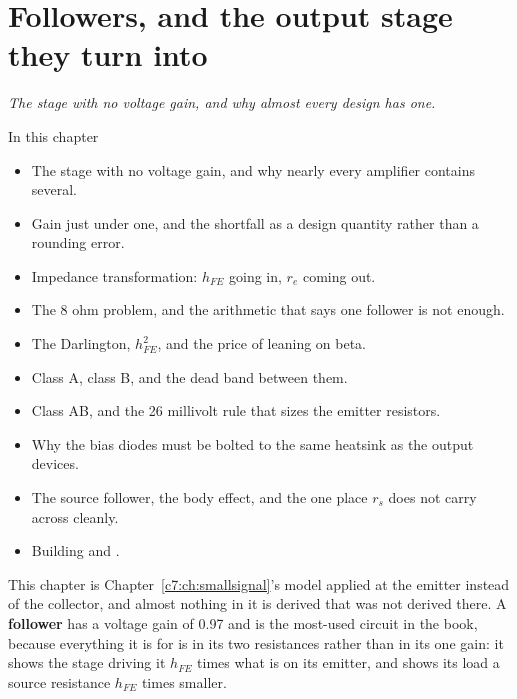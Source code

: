 
\chapter{Followers, and the output stage they turn into}
\label{c8:ch:follower}

{\large\itshape The stage with no voltage gain, and why almost every design has one.\par}

\begin{chapterbox}{In this chapter}
\begin{itemize}
  \item The stage with no voltage gain, and why nearly every amplifier contains several.
  \item Gain just under one, and the shortfall as a design quantity rather than a rounding error.
  \item Impedance transformation: $h_{FE}$ going in, $r_e$ coming out.
  \item The 8 ohm problem, and the arithmetic that says one follower is not enough.
  \item The Darlington, $h_{FE}^2$, and the price of leaning on beta.
  \item Class A, class B, and the dead band between them.
  \item Class AB, and the 26 millivolt rule that sizes the emitter resistors.
  \item Why the bias diodes must be bolted to the same heatsink as the output devices.
  \item The source follower, the body effect, and the one place $r_s$ does not carry across
    cleanly.
  \item Building  and .
\end{itemize}
\end{chapterbox}

This chapter is Chapter~\ref{c7:ch:smallsignal}'s model applied at the emitter instead of the
collector, and almost nothing in it is derived that was not derived there. A \textbf{follower} has
a voltage gain of 0.97 and is the most-used circuit in the book, because everything it is for is in
its two resistances rather than in its one gain: it shows the stage driving it $h_{FE}$ times what
is on its emitter, and shows its load a source resistance $h_{FE}$ times smaller.

